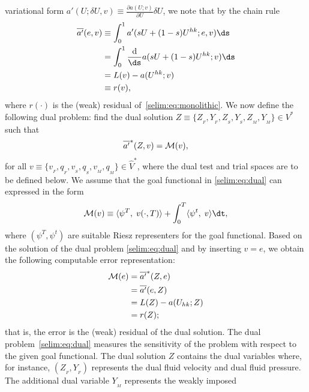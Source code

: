variational form $a'(U; \delta U,v ) \equiv \frac{\partial
  a(U;v)}{\partial U}\delta U$, we note that by the chain rule
\begin{equation}
\begin{split}
\overline{a'}(e, v)  &\equiv \int_0^1 a'(sU + (1-s)U^{hk}; e,
v) \ds
\\
&= \int_0^1 \frac{\textrm{d}}{\ds} a (sU + (1-s)U^{hk}; v) \ds
\\
&= L(v) - a(U^{hk};v)
\\ &\equiv  r(v),
\end{split}
\end{equation}
where $r(\cdot)$ is the (weak) residual of~\eqref{selim:eq:monolithic}.
We now define the following dual problem: find the dual solution
$Z\equiv \{ Z_{_{F}}, Y_{_{F}}, Z_{_{S}}, Y_{_{S}}, Z_{_{M}},
Y_{_{M}}\}\in V^*$ such that
\begin{equation}
  \label{selim:eq:dual}
  \overline{a'}^{*}(Z, v) = \mathcal{M}(v),
\end{equation}
for all $v\equiv \{ v_{_{F}}, q_{_{F}}, v_{_{S}}, q_{_{S}}, v_{_{M}}, q_{_{M}}
\}\in\hat{V}^*$, where the dual test and trial spaces are to be
defined below.
We assume that the goal functional in \eqref{selim:eq:dual} can
expressed in the form
\begin{equation}
\M(v)  \equiv \langle \psi^T,\;  v(\cdot, T) \rangle +
\int_0^T \langle \psi^t,\; v \rangle \dt,
\end{equation}
where $(\psi^T, \psi^t)$ are suitable Riesz representers for the
goal functional. Based on the solution of the dual
problem \eqref{selim:eq:dual} and by inserting $v=e$,
we obtain the following computable error representation:
\begin{equation}
\label{selim:eq:representation}
\begin{split}
\mathcal{M}(e) &= \overline{a'}^{*}(Z ,e)
\\
    &= \overline{a'}(e, Z)
\\
  &= L(Z) - a(U_{hk}; Z)
\\
  &= r(Z);
\end{split}
\end{equation}
that is, the error is the (weak) residual of the dual solution.  The
dual problem~\eqref{selim:eq:dual} measures the sensitivity of the
problem with respect to the given goal functional. The dual solution
$Z$ contains the dual variables where, for instance, $(Z_{_{F}},
Y_{_{F}})$ represents the dual fluid velocity and dual fluid pressure.
The additional dual variable $Y_{_{M}}$ represents the weakly imposed
